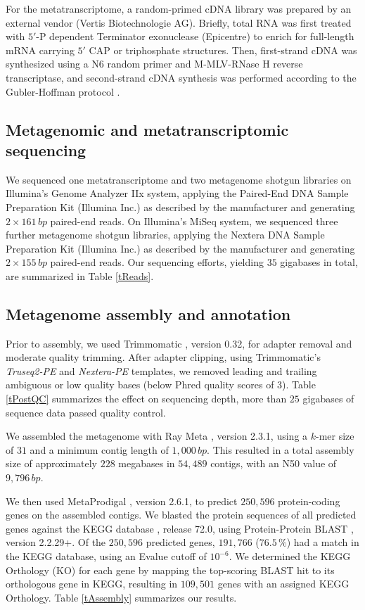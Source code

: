 \documentclass{bmcart}
\begin{document}
For the metatranscriptome, a random-primed cDNA library was prepared by an external vendor (Vertis Biotechnologie AG). Briefly, total RNA was first treated with $5'$-P dependent Terminator exonuclease (Epicentre) to enrich for full-length mRNA carrying $5'$ CAP or triphosphate structures. Then, first-strand cDNA was synthesized using a N6 random primer and M-MLV-RNase H reverse transcriptase, and second-strand cDNA synthesis was performed according to the Gubler-Hoffman protocol \cite{GublerHoffman}.

\subsection*{Metagenomic and metatranscriptomic sequencing}
We sequenced one metatranscriptome and two metagenome shotgun libraries on Illumina's Genome Analyzer IIx system, applying the Paired-End DNA Sample Preparation Kit (Illumina Inc.) as described by the manufacturer and generating $2 \times 161\,bp$ paired-end reads.
On Illumina's MiSeq system, we sequenced three further metagenome shotgun libraries, applying the Nextera DNA Sample Preparation Kit (Illumina Inc.) as described by the manufacturer and generating $2 \times 155\,bp$ paired-end reads.
Our sequencing efforts, yielding $35$ gigabases in total, are summarized in Table \ref{tReads}.

\subsection*{Metagenome assembly and annotation}
Prior to assembly, we used Trimmomatic \cite{Trimmomatic}, version 0.32, for adapter removal and moderate quality trimming.
After adapter clipping, using Trimmomatic's \emph{Truseq2-PE} and \emph{Nextera-PE} templates, we removed leading and trailing ambiguous or low quality bases (below Phred quality scores of 3).
Table \ref{tPostQC} summarizes the effect on sequencing depth, more than $25$ gigabases of sequence data passed quality control.

We assembled the metagenome with Ray Meta \cite{RayMeta}, version 2.3.1, using a $k$-mer size of $31$ and a minimum contig length of $1,000\,bp$.
This resulted in a total assembly size of approximately $228$ megabases in $54,489$ contigs, with an N50 value of $9,796\,bp$. %

We then used MetaProdigal \cite{MetaProdigal}, version 2.6.1, to predict $250,596$ protein-coding genes on the assembled contigs. We blasted the protein sequences of all predicted genes against the KEGG database \cite{KeggDB}, release 72.0, using Protein-Protein BLAST \cite{BlastPlus}, version 2.2.29+. 
Of the $250,596$ predicted genes, $191,766$ ($76.5\,\%$) had a match in the KEGG database, using an Evalue cutoff of $10^{-6}$.
We determined the KEGG Orthology (KO) for each gene by mapping the top-scoring BLAST hit to its orthologous gene in KEGG, resulting in $109,501$ genes with an assigned KEGG Orthology.
Table \ref{tAssembly} summarizes our results.
\end{document}
